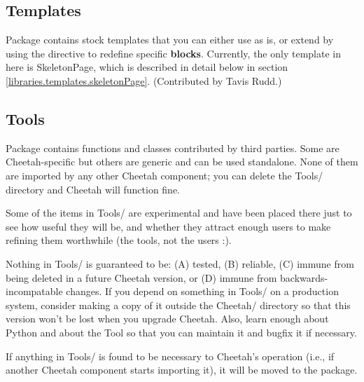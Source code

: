 \subsection{Templates}
\label{libraries.templates}

Package  contains stock templates that you can
either use as is, or extend by using the  directive to redefine
specific {\bf blocks}.  Currently, the only template in here is SkeletonPage,
which is described in detail below in section 
\ref{libraries.templates.skeletonPage}.  (Contributed by Tavis Rudd.)

\subsection{Tools}
\label{libraries.Tools}

Package  contains functions and classes contributed by third
parties.  Some are Cheetah-specific but others are generic and can be used
standalone.  None of them are imported by any other Cheetah component; you can 
delete the Tools/ directory and Cheetah will function fine.  

Some of the items in Tools/ are experimental and have been placed there just to
see how useful they will be, and whether they attract enough users to make 
refining them worthwhile (the tools, not the users :).

Nothing in Tools/ is guaranteed to be: (A) tested, (B) reliable, (C) immune
from being deleted in a future Cheetah version, or (D) immune from
backwards-incompatable changes.  If you depend on something in Tools/ on a
production system, consider making a copy of it outside the Cheetah/ directory
so that this version won't be lost when you upgrade Cheetah.  Also, learn
enough about Python and about the Tool so that you can maintain it and bugfix
it if necessary.

If anything in Tools/ is found to be necessary to Cheetah's operation (i.e., if
another Cheetah component starts importing it), it will be moved to the
 package.

